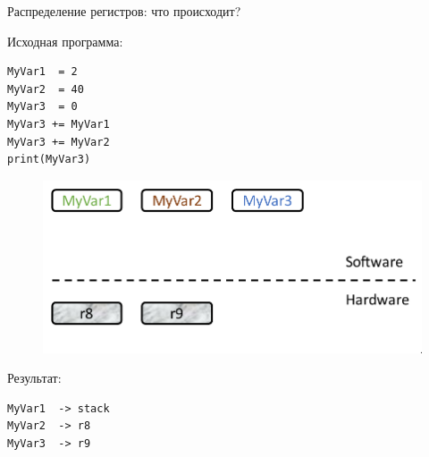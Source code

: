 \documentclass[aspectratio=169
  , xcolor={svgnames}
  , hyperref={ colorlinks,citecolor=DeepPink4
             , linkcolor=DarkRed,urlcolor=DarkBlue}
  , russian
  ]{beamer}
\theoremstyle{exerciseStyle1}
\begin{document}
\begin{frame}[fragile]{Распределение регистров: что происходит?}
\begin{minipage}{.48\textwidth}
Исходная программа:
\begin{verbatim}
MyVar1  = 2
MyVar2  = 40
MyVar3  = 0
MyVar3 += MyVar1
MyVar3 += MyVar2
print(MyVar3)
\end{verbatim}
\end{minipage}
\begin{minipage}{.48\textwidth}
\begin{figure}
\centering
\includegraphics[width=1.\linewidth]{figures/regalloc-demo1}
\end{figure}
\vspace{1cm}
Результат:
\begin{verbatim}
MyVar1  -> stack 
MyVar2  -> r8
MyVar3  -> r9
\end{verbatim}
\end{minipage}

\end{frame}
\end{document}
